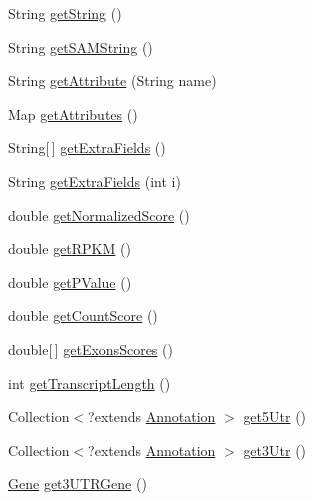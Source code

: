 \begin{DoxyCompactItemize}
\item 
String \hyperlink{classumms_1_1core_1_1annotation_1_1_gene_a8f04b65c662ee6fd8903543f0e621076}{get\+String} ()
\item 
String \hyperlink{classumms_1_1core_1_1annotation_1_1_gene_a46e618a4d6e89a7b69e3ec5563016a57}{get\+S\+A\+M\+String} ()
\item 
String \hyperlink{classumms_1_1core_1_1annotation_1_1_gene_a5b5f51555eb2e4dcc81fe17fc6957487}{get\+Attribute} (String name)
\item 
Map \hyperlink{classumms_1_1core_1_1annotation_1_1_gene_abe7756cedde6fd478befeadedf018778}{get\+Attributes} ()
\item 
String\mbox{[}$\,$\mbox{]} \hyperlink{classumms_1_1core_1_1annotation_1_1_gene_aa49a33ecfaa2a1b142313b8d07596c60}{get\+Extra\+Fields} ()
\item 
String \hyperlink{classumms_1_1core_1_1annotation_1_1_gene_a8bfc5d19c441a2c0b21b5bb3caeb0bd8}{get\+Extra\+Fields} (int i)
\item 
double \hyperlink{classumms_1_1core_1_1annotation_1_1_gene_a4b2cdaf4a39c83bd8e6ae4f480ef7c76}{get\+Normalized\+Score} ()
\item 
double \hyperlink{classumms_1_1core_1_1annotation_1_1_gene_ae5ec245344aa9abd44a4592315b8a7dc}{get\+R\+P\+K\+M} ()
\item 
double \hyperlink{classumms_1_1core_1_1annotation_1_1_gene_af48a609ac806f6adcc886dcaa4884fb7}{get\+P\+Value} ()
\item 
double \hyperlink{classumms_1_1core_1_1annotation_1_1_gene_a5acd3dbf90c17f7c1c8219aa30ba9891}{get\+Count\+Score} ()
\item 
double\mbox{[}$\,$\mbox{]} \hyperlink{classumms_1_1core_1_1annotation_1_1_gene_ae227231b6f7c160b6bfd698582b38ab7}{get\+Exons\+Scores} ()
\item 
int \hyperlink{classumms_1_1core_1_1annotation_1_1_gene_ad286d775edabc4009f3590f93acd8e89}{get\+Transcript\+Length} ()
\item 
Collection$<$?extends \hyperlink{interfaceumms_1_1core_1_1annotation_1_1_annotation}{Annotation} $>$ \hyperlink{classumms_1_1core_1_1annotation_1_1_gene_a207204cc1cf3f4e8b1db5ceba1d00d89}{get5\+Utr} ()
\item 
Collection$<$?extends \hyperlink{interfaceumms_1_1core_1_1annotation_1_1_annotation}{Annotation} $>$ \hyperlink{classumms_1_1core_1_1annotation_1_1_gene_ac0999b66a6a587bcf737ed8101f2d371}{get3\+Utr} ()
\item 
\hyperlink{classumms_1_1core_1_1annotation_1_1_gene}{Gene} \hyperlink{classumms_1_1core_1_1annotation_1_1_gene_afb42d4f238f4c58d94b75b74472083df}{get3\+U\+T\+R\+Gene} ()

\end{DoxyCompactItemize}

